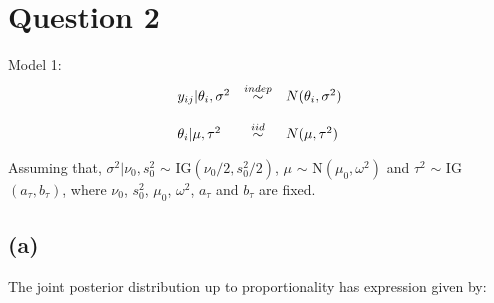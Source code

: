 \documentclass[a4paper, 11pt]{article}
\begin{document}
\section*{Question 2}

Model 1:
\begin{equation*}
\begin{array}{lcl ll }
y_{ij}|\theta_i,\sigma^2 & \stackrel{indep}{\sim} & N(\theta_i,\sigma^2) \\ \\

\theta_i | \mu, \tau^2 & \stackrel{iid}{\sim} & N(\mu,\tau^2) \\
 \end{array}
\end{equation*}

Assuming that, $\sigma^2|\nu_0, s^2	_0$ $\sim$ IG$(\nu_0/2,s_0^2/2)$, $\mu$ $\sim$ N$(\mu_0,\omega^2)$ and $\tau^2$ $\sim$ IG$(a_\tau, b_\tau)$, where $\nu_0$, $ s^2_0$, $\mu_0$, $\omega^2$, $a_\tau$ and $b_\tau$ are fixed.

\subsection*{(a)} The joint posterior distribution up to proportionality has expression given by:
\end{document}
